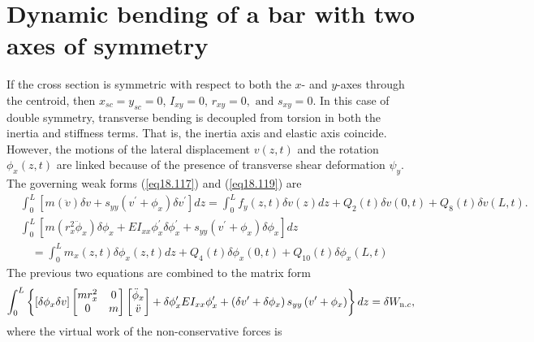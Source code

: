 \documentclass{AeroStructure-ERJohnson}
\begin{document}
\vspace*{-0.2pc}
\vspace*{-1\baselineskip}

\setcounter{equation}{136}
\section{Dynamic bending of a bar with two axes of symmetry}\label{sec18.8}

If the cross section is symmetric with respect to both the $x$- and $y$-axes through the centroid, then $x_{s c}=y_{s c}=0$, $I_{x y}=0$, $r_{x y}=0,\text{ and }s_{x y}=0$. In this case of double symmetry, transverse bending is decoupled from torsion in both the inertia and stiffness terms. That is, the inertia axis and elastic axis coincide. However, the motions of the lateral displacement $v(z, t)$ and the rotation $\phi_{x}(z, t)$ are linked because of the presence of transverse shear deformation $\psi_{y}$. The governing weak forms (\ref{eq18.117}) and (\ref{eq18.119}) are
\begin{align*}
&\int_{0}^{L}\left[m(\ddot{v}) \delta v+s_{y y}\left(v^{\prime}+\phi_{x}\right) \delta v^{\prime}\right] d z=\int_{0}^{L} f_{y}(z, t) \delta v(z) d z+Q_{2}(t) \delta v(0, t)+Q_{8}(t) \delta v(L, t).\\
&\int_{0}^{L}\left[m\left(r_{x}^{2} \ddot{\phi}_{x}\right) \delta \phi_{x}+E I_{x x} \phi_{x}^{\prime} \delta \phi_{x}^{\prime}+s_{y y}\left(v^{\prime}+\phi_{x}\right) \delta \phi_{x}\right] d z\\
&\quad=\int_{0}^{L} m_{x}(z, t) \delta \phi_{x}(z, t) d z+Q_{4}(t) \delta \phi_{x}(0, t)+Q_{10}(t) \delta \phi_{x}(L, t)
\end{align*}
The previous two equations are combined to the matrix form
\begin{align}\label{eq18.137}
\int_{0}^{L}\left\{\left[\delta \phi_{x} \delta v\right]\left[\begin{array}{@{}cc@{}}m r_{x}^{2} & 0 \\0 & m\end{array}\right]\left[\begin{array}{@{}c@{}}\ddot{\phi}_x \\\ddot{v}\end{array}\right]+\delta \phi_{x}^{\prime} E I_{x x} \phi_{x}^{\prime}+\left(\delta v^{\prime}+\delta \phi_{x}\right) s_{y y}\left(v^{\prime}+\phi_{x}\right)\right\} d z=\delta W_{\mathrm{n}. c},
\end{align}
where the virtual work of the non-conservative forces is
\end{document}
